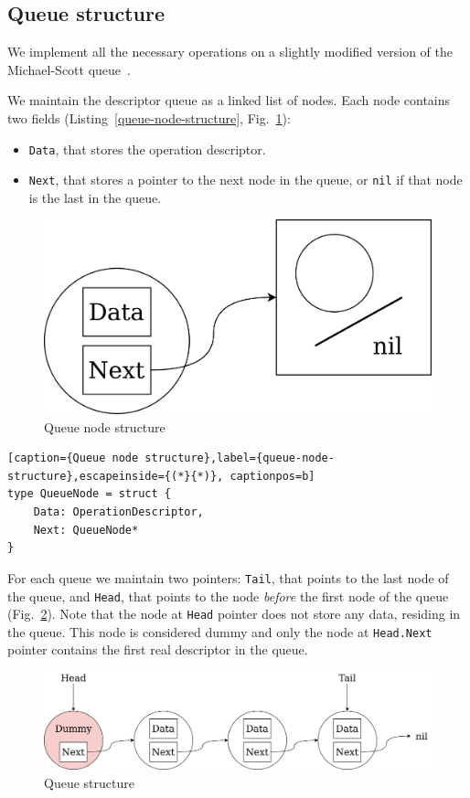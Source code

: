 \documentclass[times, dvipsnames,%
               languages={russian,english} %
              ]{itmo-student-thesis}
\begin{document}
\subsection{Queue structure}
\label{queue-structure-section}

We implement all the necessary operations on a slightly modified version of the Michael-Scott queue~\cite{michael1996simple}.

We maintain the descriptor queue as a linked list of nodes. Each node contains two fields (Listing~\ref{queue-node-structure}, Fig.~\ref{queue-node-pic}):

\begin{itemize}
    \item \texttt{Data}, that stores the operation descriptor.
    \item \texttt{Next}, that stores a pointer to the next node in the queue, or \texttt{nil} if that node is the last in the queue.
\end{itemize}

\begin{figure}[H]
  \centering
  \caption{Queue node structure}
  \label{queue-node-pic}
  \includegraphics[width=0.5\linewidth]{pics/queue-node.png}
\end{figure}

\renewcommand{\lstlistingname}{Listing}
\begin{lstlisting}[caption={Queue node structure},label={queue-node-structure},escapeinside={(*}{*)}, captionpos=b]
type QueueNode = struct {
    Data: OperationDescriptor,
    Next: QueueNode*
}
\end{lstlisting}

For each queue we maintain two pointers: \texttt{Tail}, that points to the last node of the queue, and \texttt{Head}, that points to the node \emph{before} the first node of the queue (Fig.~\ref{queue-structure-pic}). Note that the node at \texttt{Head} pointer does not store any data, residing in the queue. This node is considered dummy and only the node at \texttt{Head.Next} pointer contains the first real descriptor in the queue.

\begin{figure}[H]
  \centering
  \caption{Queue structure}
  \label{queue-structure-pic}
  \includegraphics[width=\linewidth]{pics/queue-structure.png}
\end{figure}
\end{document}
